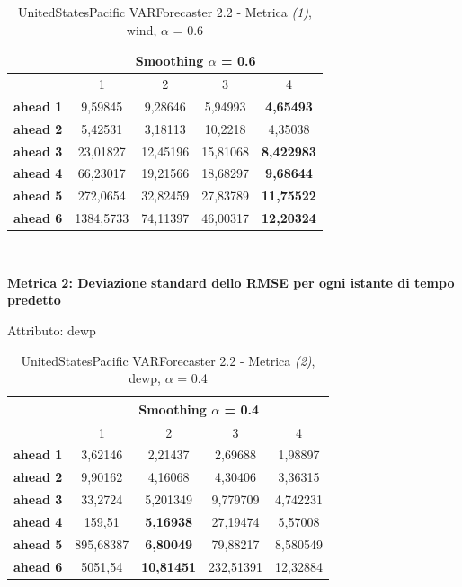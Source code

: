 \documentclass[12pt,a4paper,oneside,openright]{book}
\begin{document}
\medskip

\begin{table}[H]
\centering
\begin{tabular}{|c|c|c|c|c|}
\hline
 & \multicolumn{4}{|c|}{Smoothing $\alpha$ = 0.6} \\
\hline
& 1 & 2 & 3 & 4 \\
\hline
\textbf{ahead 1} & 9,59845 & 9,28646 & 5,94993 & \textbf{4,65493} \\
\hline
\textbf{ahead 2} & 5,42531 & 3,18113 & 10,2218 & 4,35038 \\ 
\hline
\textbf{ahead 3} & 23,01827 & 12,45196 & 15,81068 & \textbf{8,422983}\\
\hline
\textbf{ahead 4} & 66,23017 & 19,21566 & 18,68297 & \textbf{9,68644}\\ 
\hline
\textbf{ahead 5} & 272,0654 & 32,82459 & 27,83789 & \textbf{11,75522}\\
\hline
\textbf{ahead 6} & 1384,5733 & 74,11397 & 46,00317 & \textbf{12,20324}\\ 
\hline
\end{tabular} \\
\caption{UnitedStatesPacific VARForecaster 2.2 - Metrica \textit{(1)}, wind, $\alpha$ = 0.6}
\end{table} 
\newpage

\textbf{Metrica 2: Deviazione standard dello RMSE per ogni istante di tempo predetto}

\medskip

Attributo: dewp \\

\begin{table}[H]
\centering
\begin{tabular}{|c|c|c|c|c|}
\hline
 & \multicolumn{4}{|c|}{Smoothing $\alpha$ = 0.4} \\
\hline
& 1 & 2 & 3 & 4 \\
\hline
\textbf{ahead 1} & 3,62146 & 2,21437 & 2,69688 & 1,98897 \\
\hline
\textbf{ahead 2} & 9,90162 & 4,16068 & 4,30406 & 3,36315\\
\hline
\textbf{ahead 3} & 33,2724 & 5,201349 & 9,779709 & 4,742231\\
\hline
\textbf{ahead 4} & 159,51 & \textbf{5,16938} & 27,19474 & 5,57008\\ 
\hline
\textbf{ahead 5} & 895,68387 & \textbf{6,80049} & 79,88217 & 8,580549\\
\hline
\textbf{ahead 6} & 5051,54 & \textbf{10,81451} & 232,51391 & 12,32884\\ 
\hline
\end{tabular} \\
\caption{UnitedStatesPacific VARForecaster 2.2 - Metrica \textit{(2)}, dewp, $\alpha$ = 0.4}
\end{table} 
\end{document}
